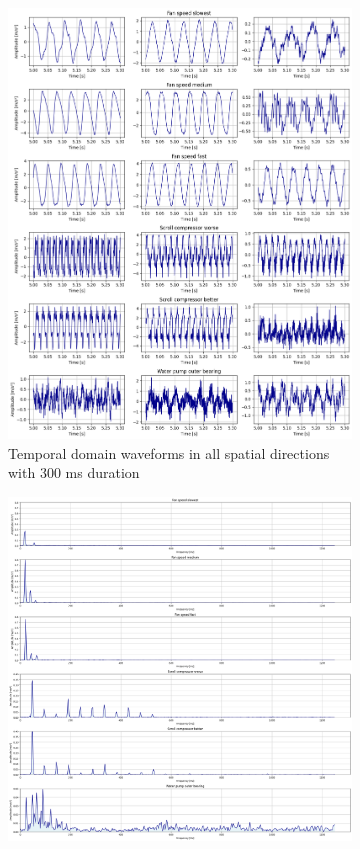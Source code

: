 \begin{figure}[ht]
    \centering
    \begin{subfigure}[b]{0.44\textwidth}
        \includegraphics[width=\textwidth]{assets/design/EDA-custom-dataset-temporal.png}
        \caption{Temporal domain waveforms in all spatial directions with 300 ms duration}
    \end{subfigure}
    \hfill
    \begin{subfigure}[b]{0.55\textwidth}
        \includegraphics[width=\textwidth]{assets/design/EDA-custom-dataset-spectral-X-axis.png}

\end{subfigure}
\end{figure}
